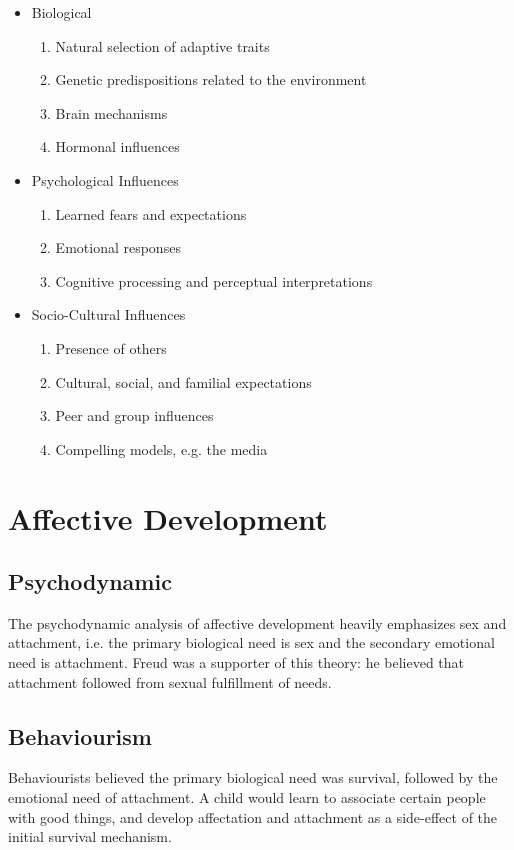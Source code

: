 \documentclass[12pt]{article}
\begin{document}
\begin{itemize}
\item Biological
\begin{enumerate}
\item Natural selection of adaptive traits
\item Genetic predispositions related to the environment
\item Brain mechanisms
\item Hormonal influences
\end{enumerate}
\item Psychological Influences
\begin{enumerate}
\item Learned fears and expectations
\item Emotional responses
\item Cognitive processing and perceptual interpretations
\end{enumerate}
\item Socio-Cultural Influences
\begin{enumerate}
\item Presence of others
\item Cultural, social, and familial expectations
\item Peer and group influences
\item Compelling models, e.g. the media
\end{enumerate}
\end{itemize}

\section*{Affective Development}
\subsection*{Psychodynamic}
The psychodynamic analysis of affective development heavily emphasizes sex and attachment, i.e. the primary biological need is sex and the secondary emotional need is attachment. Freud was a supporter of this theory: he believed that attachment followed from sexual fulfillment of needs.

\subsection*{Behaviourism}
Behaviourists believed the primary biological need was survival, followed by the emotional need of attachment. A child would learn to associate certain people with good things, and develop affectation and attachment as a side-effect of the initial survival mechanism.
\end{document}
